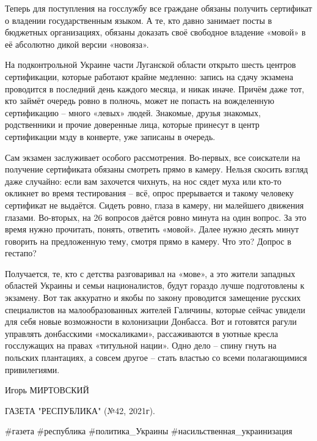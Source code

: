 Теперь для поступления на госслужбу все граждане обязаны получить сертификат о
владении государственным языком. А те, кто давно занимает посты в бюджетных
организациях, обязаны доказать своё свободное владение «мовой» в её абсолютно
дикой версии «новояза». 

На подконтрольной Украине части Луганской области открыто шесть центров
сертификации, которые работают крайне медленно: запись на сдачу экзамена
проводится в последний день каждого месяца, и никак иначе. Причём даже тот, кто
займёт очередь ровно в полночь, может не попасть на вожделенную сертификацию –
много «левых» людей. Знакомые, друзья знакомых, родственники и прочие
доверенные лица, которые принесут в центр сертификации мзду в конверте, уже
записаны в очередь. 

Сам экзамен заслуживает особого рассмотрения. Во-первых, все соискатели на
получение сертификата обязаны смотреть прямо в камеру. Нельзя скосить взгляд
даже случайно: если вам захочется чихнуть, на нос сядет муха или кто-то
окликнет во время тестирования – всё, опрос прерывается и такому человеку
сертификат не выдаётся. Сидеть ровно, глаза в камеру, ни малейшего движения
глазами. Во-вторых, на 26 вопросов даётся ровно минута на один вопрос. За это
время нужно прочитать, понять, ответить «мовой». Далее нужно десять минут
говорить на предложенную тему, смотря прямо в камеру. Что это? Допрос в
гестапо? 

Получается, те, кто с детства разговаривал на «мове», а это жители западных
областей Украины и семьи националистов, будут гораздо лучше подготовлены к
экзамену. Вот так аккуратно и якобы по закону проводится замещение русских
специалистов на малообразованных жителей Галичины, которые сейчас увидели для
себя новые возможности в колонизации Донбасса. Вот и готовятся рагули управлять
донбасскими «москаликами», рассаживаются в уютные кресла госслужащих на правах
«титульной нации». Одно дело – спину гнуть на польских плантациях, а совсем
другое – стать властью со всеми полагающимися привилегиями. 

Игорь МИРТОВСКИЙ

ГАЗЕТА "РЕСПУБЛИКА" (№42, 2021г).

\#газета \#республика \#политика\_Украины \#насильственная\_украинизация
